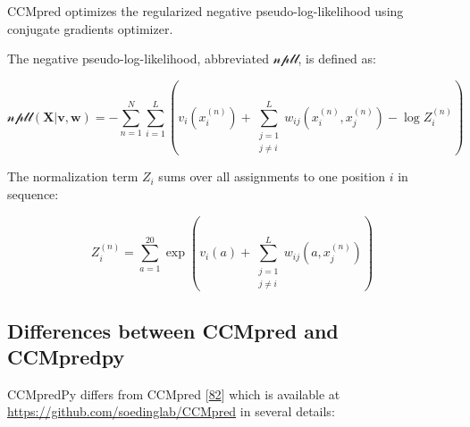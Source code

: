 \documentclass[12pt,a4paper,twoside]{book}
\renewcommand{\v}{\mathbf{v}}
\newcommand{\w}{\mathbf{w}}
\theoremstyle{definition}
\theoremstyle{definition}
\theoremstyle{remark}
\begin{document}
CCMpred optimizes the regularized negative pseudo-log-likelihood using
conjugate gradients optimizer.

The negative pseudo-log-likelihood, abbreviated \(\mathcal{npll}\), is
defined as:

\begin{equation}
  \mathcal{npll}(\mathbf{X} | \v,\w) =   - \sum_{n=1}^N \sum_{i=1}^L  \left(  v_i(x_i^{(n)}) + \sum_{\substack{j=1 \\ j \neq i}}^L w_{ij}(x_i^{(n)}, x_j^{(n)})  - \log Z_i^{(n)} \right)
\end{equation}

The normalization term \(Z_i\) sums over all assignments to one position
\(i\) in sequence:

\begin{equation}
  Z_i^{(n)} = \sum_{a=1}^{20} \exp \left( v_i(a) + \sum_{\substack{j=1 \\ j \neq i}}^L w_{ij}(a, x_j^{(n)}) \right)
\end{equation}

\subsection{Differences between CCMpred and
CCMpredpy}\label{diff-ccmpred-ccmpredpy}

CCMpredPy differs from CCMpred
{[}\protect\hyperlink{ref-Seemayer2014}{82}{]} which is available at
\url{https://github.com/soedinglab/CCMpred} in several details:
\end{document}
